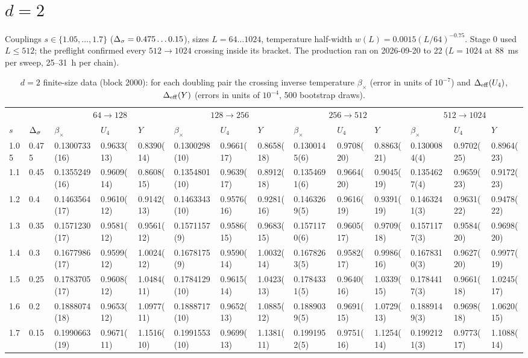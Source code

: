 \section{\texorpdfstring{$d=2$}{d=2}}\label{mc:sec:2d}
Couplings $s\in\{1.05,\dots,1.7\}$ ($\Delta_\sigma=0.475\dots0.15$), sizes $L=64\dots1024$, temperature half-width $w(L)=0.0015(L/64)^{-0.75}$. Stage 0 used
$L\le512$; the preflight confirmed every $512\to1024$ crossing inside its bracket. The production ran on 2026-09-20 to 22 ($L=1024$ at 88~ms per
sweep, 25--31~h per chain).
\begin{table}\centering\scriptsize
\caption{$d=2$ finite-size data (block 2000): for each doubling pair the crossing inverse temperature $\beta_\times$ (error in units of $10^{-7}$) and
$\Delta_{\rm eff}(U_4)$, $\Delta_{\rm eff}(Y)$ (errors in units of $10^{-4}$, 500 bootstrap draws).}\label{mc:tab:2dpairs}
\begin{tabular}{@{}ll|lll|lll|lll|lll@{}}\toprule
 & & \multicolumn{3}{c|}{$64\to128$} & \multicolumn{3}{c|}{$128\to256$} & \multicolumn{3}{c|}{$256\to512$} & \multicolumn{3}{c}{$512\to1024$}\\
$s$ & $\Delta_\sigma$ & $\beta_\times$ & $U_4$ & $Y$ & $\beta_\times$ & $U_4$ & $Y$ & $\beta_\times$ & $U_4$ & $Y$ & $\beta_\times$ & $U_4$ & $Y$ \\\midrule
1.05 & 0.475 & 0.1300733(16) & 0.9633(13) & 0.8390(14) & 0.1300298(10) & 0.9661(17) & 0.8658(18) & 0.1300145(6) & 0.9708(20) & 0.8863(21) & 0.1300084(4) & 0.9702(25) & 0.8964(23) \\
1.1 & 0.45 & 0.1355249(16) & 0.9609(14) & 0.8608(15) & 0.1354801(10) & 0.9639(17) & 0.8912(18) & 0.1354691(6) & 0.9664(20) & 0.9045(19) & 0.1354627(4) & 0.9659(23) & 0.9172(23) \\
1.2 & 0.4 & 0.1463564(17) & 0.9610(12) & 0.9142(13) & 0.1463343(10) & 0.9576(16) & 0.9281(16) & 0.1463269(5) & 0.9616(19) & 0.9391(19) & 0.1463241(3) & 0.9631(22) & 0.9478(22) \\
1.3 & 0.35 & 0.1571230(17) & 0.9581(12) & 0.9561(12) & 0.1571157(9) & 0.9586(15) & 0.9683(15) & 0.1571170(6) & 0.9605(17) & 0.9709(18) & 0.1571177(3) & 0.9584(20) & 0.9698(20) \\
1.4 & 0.3 & 0.1677986(17) & 0.9599(12) & 1.0024(12) & 0.1678175(9) & 0.9590(14) & 1.0032(14) & 0.1678263(5) & 0.9582(17) & 0.9986(16) & 0.1678310(3) & 0.9627(20) & 0.9977(19) \\
1.5 & 0.25 & 0.1783705(17) & 0.9608(12) & 1.0484(11) & 0.1784129(10) & 0.9615(14) & 1.0423(13) & 0.1784331(5) & 0.9640(16) & 1.0339(15) & 0.1784417(3) & 0.9661(18) & 1.0245(17) \\
1.6 & 0.2 & 0.1888074(18) & 0.9653(12) & 1.0977(11) & 0.1888717(10) & 0.9652(13) & 1.0885(12) & 0.1889039(5) & 0.9691(15) & 1.0729(13) & 0.1889149(3) & 0.9698(18) & 1.0620(15) \\
1.7 & 0.15 & 0.1990663(19) & 0.9671(11) & 1.1516(10) & 0.1991553(10) & 0.9699(13) & 1.1381(11) & 0.1991952(5) & 0.9751(16) & 1.1254(14) & 0.1992121(3) & 0.9773(17) & 1.1088(14) \\
\bottomrule\end{tabular}
\end{table}
